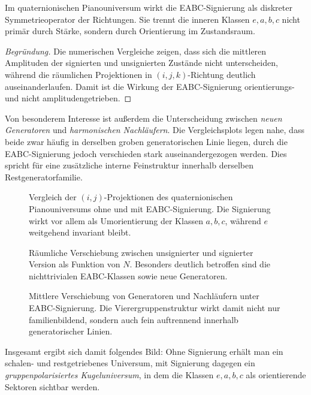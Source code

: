 \begin{proposition}
	Im quaternionischen Pianouniversum wirkt die EABC-Signierung als diskreter Symmetrieoperator der Richtungen.
	Sie trennt die inneren Klassen \(e,a,b,c\) nicht primär durch Stärke, sondern durch Orientierung im Zustandsraum.
\end{proposition}

\begin{proof}[Begründung]
	Die numerischen Vergleiche zeigen, dass sich die mittleren Amplituden der signierten und unsignierten Zustände nicht unterscheiden, während die räumlichen Projektionen in \((i,j,k)\)-Richtung deutlich auseinanderlaufen.
	Damit ist die Wirkung der EABC-Signierung orientierungs- und nicht amplitudengetrieben.
\end{proof}

Von besonderem Interesse ist außerdem die Unterscheidung zwischen \emph{neuen Generatoren} und \emph{harmonischen Nachläufern}. 
Die Vergleichsplots legen nahe, dass beide zwar häufig in derselben groben generatorischen Linie liegen, durch die EABC-Signierung jedoch verschieden stark auseinandergezogen werden.
Dies spricht für eine zusätzliche interne Feinstruktur innerhalb derselben Restgeneratorfamilie.

\begin{figure}[t]
	\centering
	\caption{Vergleich der \((i,j)\)-Projektionen des quaternionischen Pianouniversums ohne und mit EABC-Signierung. Die Signierung wirkt vor allem als Umorientierung der Klassen \(a,b,c\), während \(e\) weitgehend invariant bleibt.}
	\label{fig:pianouniverse_ij_compare}
\end{figure}

\begin{figure}[t]
	\centering
	\caption{Räumliche Verschiebung zwischen unsignierter und signierter Version als Funktion von \(N\). Besonders deutlich betroffen sind die nichttrivialen EABC-Klassen sowie neue Generatoren.}
	\label{fig:pianouniverse_displacement}
\end{figure}

\begin{figure}[t]
	\centering
	\caption{Mittlere Verschiebung von Generatoren und Nachläufern unter EABC-Signierung. Die Vierergruppenstruktur wirkt damit nicht nur familienbildend, sondern auch fein auftrennend innerhalb generatorischer Linien.}
	\label{fig:pianouniverse_generators_followers}
\end{figure}

Insgesamt ergibt sich damit folgendes Bild:
Ohne Signierung erhält man ein schalen- und restgetriebenes Universum, mit Signierung dagegen ein \emph{gruppenpolarisiertes Kugeluniversum}, in dem die Klassen \(e,a,b,c\) als orientierende Sektoren sichtbar werden.